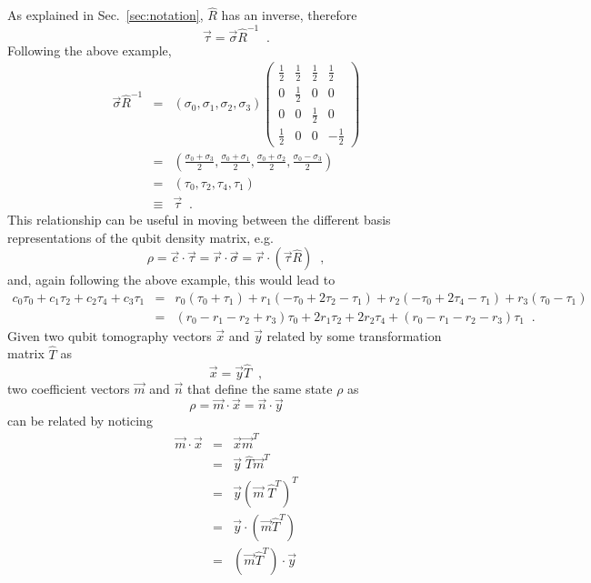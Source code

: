 As explained in Sec.\ \ref{sec:notation}, $\hat{R}$ has an inverse, therefore
$$
\vec{\tau} = \vec{\sigma}\hat{R}^{-1}\;\;.
$$
Following the above example,
\begin{eqnarray*}
\vec{\sigma}\hat{R}^{-1} &=& (\sigma_0,\sigma_1,\sigma_2,\sigma_3)\begin{pmatrix}
\frac{1}{2} & \frac{1}{2} & \frac{1}{2} & \frac{1}{2}\\
0 & \frac{1}{2} & 0 & 0\\
0 & 0 & \frac{1}{2} & 0\\
\frac{1}{2} & 0 & 0 & -\frac{1}{2}
\end{pmatrix}\\
&=& \left(\frac{\sigma_0+\sigma_3}{2},\frac{\sigma_0+\sigma_1}{2},\frac{\sigma_0+\sigma_2}{2},\frac{\sigma_0-\sigma_3}{2}\right)\\
&=& (\tau_0,\tau_2,\tau_4,\tau_1)\\
&\equiv& \vec{\tau}\;\;. 
\end{eqnarray*}
This relationship can be useful in moving between the different basis representations of the qubit density matrix, e.g.\
$$
\rho = \vec{c}\cdot\vec{\tau} = \vec{r}\cdot\vec{\sigma} = \vec{r}\cdot\left(\vec{\tau}\hat{R}\right)\;\;,
$$
and, again following the above example, this would lead to 
\begin{eqnarray*}
c_0\tau_0+c_1\tau_2+c_2\tau_4+c_3\tau_1 &=& r_0\left(\tau_0+\tau_1\right)+r_1\left(-\tau_0+2\tau_2-\tau_1\right)+r_2\left(-\tau_0+2\tau_4-\tau_1\right)+r_3\left(\tau_0-\tau_1\right)\\
&=& \left(r_0-r_1-r_2+r_3\right)\tau_0+2r_1\tau_2+2r_2\tau_4+\left(r_0-r_1-r_2-r_3\right)\tau_1\;\;.
\end{eqnarray*}
Given two qubit tomography vectors $\vec{x}$ and $\vec{y}$ related by some transformation matrix $\hat{T}$ as
$$
\vec{x} = \vec{y} \hat{T}\;\;,
$$
two coefficient vectors $\vec{m}$ and $\vec{n}$ that define the same state $\rho$ as
\begin{equation}
\label{eqn:tworho}
\rho = \vec{m}\cdot\vec{x} = \vec{n}\cdot\vec{y}
\end{equation}
can be related by noticing
\begin{eqnarray*}
\vec{m}\cdot\vec{x} &=& \vec{x}\vec{m}^T\\
&=&\vec{y}\;\hat{T}\vec{m}^T\\
&=&\vec{y}\left(\vec{m}\;\hat{T}^T\right)^T\\
&=& \vec{y}\cdot\left(\vec{m}\hat{T}^T\right)\\
&=& \left(\vec{m}\hat{T}^T\right)\cdot\vec{y}
\end{eqnarray*}
